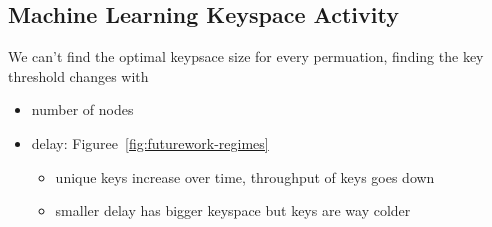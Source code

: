 \subsection{Machine Learning Keyspace Activity}

We can't find the optimal keypsace size for every permuation, finding the key threshold changes with
\begin{itemize}
  \item number of nodes
  \item delay: Figuree~\ref{fig:futurework-regimes}
  \begin{itemize}
    \item unique keys increase over time, throughput of keys goes down
    \item smaller delay has bigger keyspace but keys are way colder 
  \end{itemize}
\end{itemize}


%
%
%
%
%
%
%
%
%
%
%
%
%
